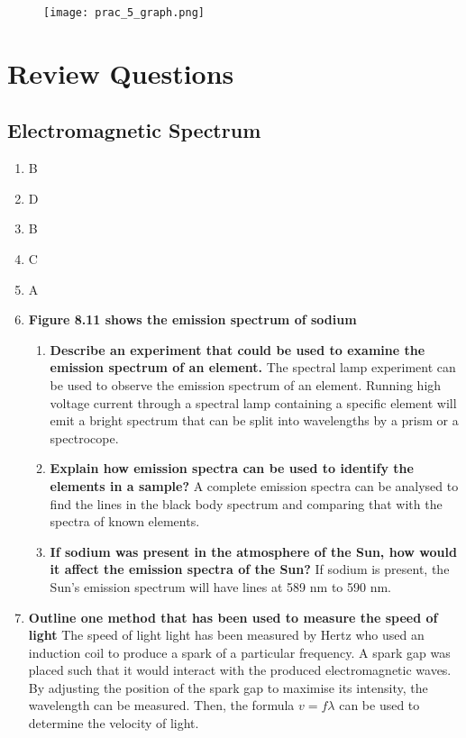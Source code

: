 \documentclass{report}
\begin{document}
			\begin{figure}[H]
				\centering
				\texttt{[image: prac\_5\_graph.png]}
			\end{figure}

\newpage

\chapter{Review Questions}

	\section{Electromagnetic Spectrum}
		\begin{enumerate}
			\item B
			\item D
			\item B
			\item C
			\item A
			\item \textbf{Figure 8.11 shows the emission spectrum of sodium}
				\begin{enumerate}
					\item \textbf{Describe an experiment that could be used to examine the emission spectrum of an element.}
						\subitem The spectral lamp experiment can be used to observe the emission spectrum of an element. Running high voltage current through a spectral lamp containing a specific element will emit a bright spectrum that can be split into wavelengths by a prism or a spectrocope.

					\item \textbf{Explain how emission spectra can be used to identify the elements in a sample?}
						\subitem A complete emission spectra can be analysed to find the lines in the black body spectrum and comparing that with the spectra of known elements.

					\item \textbf{If sodium was present in the atmosphere of the Sun, how would it affect the emission spectra of the Sun?}
						\subitem If sodium is present, the Sun's emission spectrum will have lines at 589 nm to 590 nm.
				\end{enumerate}

			\item \textbf{Outline one method that has been used to measure the speed of light}
				\subitem The speed of light light has been measured by Hertz who used an induction coil to produce a spark of a particular frequency. A spark gap was placed such that it would interact with the produced electromagnetic waves. By adjusting the position of the spark gap to maximise its intensity, the wavelength can be measured. Then, the formula $v=f \lambda$ can be used to determine the velocity of light.


\end{enumerate}
\end{document}
